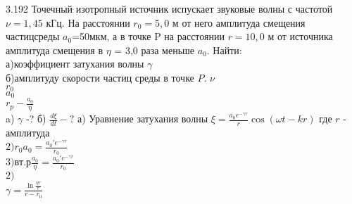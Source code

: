 \testCom
{%
	3.192
}
{%
	Точечный изотропный источник испускает звуковые волны с частотой $\nu = 1,45$ кГц. На расстоянии $r_0=5,0$ м от него амплитуда смещения частицсреды $a_0$=50мкм, а в точке P на расстоянии $r =10,0$ м от источника амплитуда смещения в $\eta$ = 3,0 раза меньше $a_0$. Найти:\\
	а)коэффициент затухания волны $\gamma$\\
	б)амплитуду скорости частиц среды в точке $P$.
}
{%
	$\nu$\\
	$r_0$\\
	$a_0$\\
	$r_p - \frac{a_0}{\eta}$\\
}
{%
	a) $\gamma$ -?
	б) $\frac{d\xi}{dt} - ?$
}
{%
	а) Уравнение затухания волны $\xi = \frac{a_0 e^{-\gamma r}}{r} \cos (\omega t - k r)$ где $r$ - амплитуда\\
	$2) r_0 a_0 = \frac{a_0' e^{-\gamma r}}{r_0}$\\
	$3) в т.р  \frac{a_0}{\eta} =  \frac{a_0' e^{-\gamma r}}{r_0}$\\
	$2)$\\
	$\gamma = \frac{\ln \frac{\eta r}{r}}{r - r_0}$\\
}

